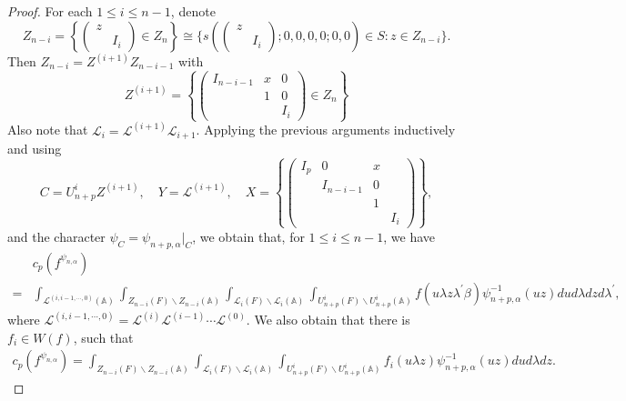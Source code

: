 \documentclass[12pt]{amsart}
\newcommand{\A}{\mathbb{A}}
\theoremstyle{remark}
\begin{document}
\begin{proof}
For each $1\le i \le n-1$, denote
\begin{equation*}
Z_{n-i}=\left\{ \begin{pmatrix} z & \\ &I_{i}\end{pmatrix}\in Z_n\right\} \cong\{s\left( \begin{pmatrix} z&\\&I_i\end{pmatrix};0,0,0,0;0,0\right)\in S:z\in Z_{n-i} \}.   	
\end{equation*}
Then $Z_{n-i}=Z^{(i+1)} Z_{n-i-1}$ with
\begin{equation*}
Z^{(i+1)}=	\left\{ \begin{pmatrix} I_{n-i-1} & x&0\\ &1&0\\ & &I_{i}\end{pmatrix}\in Z_n\right\} 
\end{equation*}
Also note that $\mathcal{L}_i=\mathcal{L}^{(i+1)}\mathcal{L}_{i+1}$. Applying the previous arguments inductively and using
\begin{equation*}
C=U_{n+p}^{i} Z^{(i+1)},\quad  Y=\mathcal{L}^{(i+1)}, \quad X=\left\{ \begin{pmatrix} I_p &0&x&\\ &I_{n-i-1} &0&\\&&1&\\ &&&I_i\end{pmatrix} \right\},	
\end{equation*}
and the character $\psi_C=\psi_{n+p,\alpha}\Big|_{C}$, we obtain that, for $1\le i \le n-1$, we have
\begin{equation}
\label{eq-prop-ConstantTerm-prop1-eq8}
\begin{split}
&c_p(f^{\psi_{n,\alpha}})\\
=&\int_{\mathcal{L}^{(i,i-1, \cdots, 0)}(\A)} \int_{Z_{n-i}(F)\backslash Z_{n-i}(\A)} \int_{\mathcal{L}_i(F)\backslash \mathcal{L}_i(\A)} \int_{U_{n+p}^i(F)\backslash U_{n+p}^i(\A)} f( u \lambda z \lambda^\prime \beta) \psi_{n+p,\alpha}^{-1}(uz) dud\lambda dz d\lambda^\prime,	
\end{split}
\end{equation}
where $\mathcal{L}^{(i, i-1, \cdots,0)}=\mathcal{L}^{(i)} \mathcal{L}^{(i-1)} \cdots \mathcal{L}^{(0)}$. We also obtain that there is $f_i\in W(f)$, such that
\begin{equation}
\label{eq-prop-ConstantTerm-prop1-eq9}
\begin{split}
c_p(f^{\psi_{n,\alpha}})= \int_{Z_{n-i}(F)\backslash Z_{n-i}(\A)} \int_{\mathcal{L}_i(F)\backslash \mathcal{L}_i(\A)} \int_{U_{n+p}^i(F)\backslash U_{n+p}^i(\A)} f_i( u \lambda z  ) \psi_{n+p,\alpha}^{-1}(uz) dud\lambda dz .	

\end{split}
\end{equation}
\end{proof}
\end{document}
